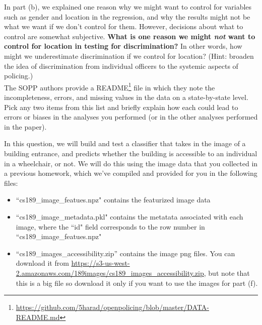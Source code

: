 \documentclass[preview]{standalone}
\begin{document}
\begin{Parts}
\begin{itemize}
\end{itemize}


\Part In part (b), we explained one reason why we might want to control for variables such as gender and location in the regression, and why the results might not be what we want if we don’t control for them. 
However, decisions about what to control are somewhat subjective. \textbf{What is one reason we might \emph{not} want to control for location in testing for discrimination?} In other words, how might we underestimate discrimination if we control for location? (Hint: broaden the idea of discrimination from individual officers to the systemic aspects of policing.) \\ 

\Part The SOPP authors provide a README\footnote{\url{https://github.com/5harad/openpolicing/blob/master/DATA-README.md}} file in which they note the incompleteness, errors, and missing values in the data on a state-by-state level. Pick any two items from this list and briefly explain how each could lead to errors or biases in the analyses you performed (or in the other analyses performed in the paper). \\

 \end{Parts}




 In this question, we will build and test a classifier that takes in the image of a building entrance, and predicts whether the building is accessible to an individual in a wheelchair, or not. We will do this using the image data that you collected in a previous homework, which we've compiled and provided for you in the following files:
 \begin{itemize}
\item ``cs189\_image\_featues.npz" contains the featurized image data
\item ``cs189\_image\_metadata.pkl" contains the metatata associated with each image, where the ``id" field corresponds to the row number in ``cs189\_image\_featues.npz"
\item ``cs189\_images\_accessibility.zip'' contains the image png files. You can download it from \url{https://s3-us-west-2.amazonaws.com/189images/cs189_images_accessibility.zip}, but note that this is a big file so download it only if you want to use the images for part (f). 
 \end{itemize}
\end{document}
